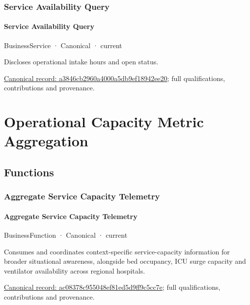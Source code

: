 \subsubsection{Service Availability Query}

\paragraph{Service Availability Query}

\label{element:a3846cb2960a4000a5db9ef18942ee20}
{\small BusinessService · Canonical · current}\par

Discloses operational intake hours and open status.


{\footnotesize \href{../../../../continuum/business/business-service/a3846cb2960a4000a5db9ef18942ee20.md}{Canonical record: a3846cb2960a4000a5db9ef18942ee20}; full qualifications, contributions and provenance.}\par
\section{Operational Capacity Metric Aggregation}

\subsection{Functions}

\subsubsection{Aggregate Service Capacity Telemetry}

\paragraph{Aggregate Service Capacity Telemetry}

\label{element:ac08378c955048ef81ed5d9ff9c5cc7e}
{\small BusinessFunction · Canonical · current}\par

Consumes and coordinates context-specific service-capacity information for broader situational awareness, alongside bed occupancy, ICU surge capacity and ventilator availability across regional hospitals.


{\footnotesize \href{../../../../continuum/business/business-function/ac08378c955048ef81ed5d9ff9c5cc7e.md}{Canonical record: ac08378c955048ef81ed5d9ff9c5cc7e}; full qualifications, contributions and provenance.}\par

